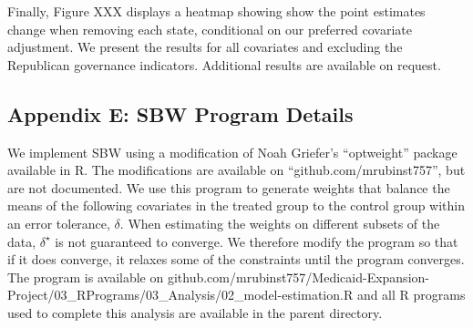 \documentclass[12pt]{article}
\begin{document}
Finally, Figure XXX displays a heatmap showing show the point estimates change when removing each state, conditional on our preferred covariate adjustment. We present the results for all covariates and excluding the Republican governance indicators. Additional results are available on request. 




\subsection{Appendix E: SBW Program Details}

We implement SBW using a modification of Noah Griefer's ``optweight'' package available in R. The modifications are available on ``github.com/mrubinst757'', but are not documented. We use this program to generate weights that balance the means of the following covariates in the treated group to the control group within an error tolerance, $\delta$. When estimating the weights on different subsets of the data, $\delta^\star$ is not guaranteed to converge. We therefore modify the program so that if it does converge, it relaxes some of the constraints until the program converges. The program is available on github.com/mrubinst757/Medicaid-Expansion-Project/03\_RPrograms/03\_Analysis/02\_model-estimation.R and all R programs used to complete this analysis are available in the parent directory.
\end{document}

